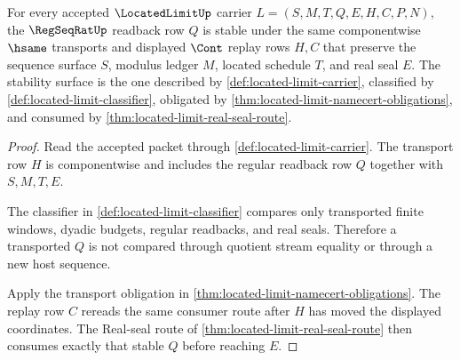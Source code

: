 \begin{theorem}
\label{thm:located-limit-regseqrat-readback-stability}
For every accepted $\LocatedLimitUp$ carrier $L=(S,M,T,Q,E,H,C,P,N)$, the $\RegSeqRatUp$ readback row $Q$ is stable under the same componentwise $\hsame$ transports and displayed $\Cont$ replay rows $H,C$ that preserve the sequence surface $S$, modulus ledger $M$, located schedule $T$, and real seal $E$. The stability surface is the one described by \autoref{def:located-limit-carrier}, classified by \autoref{def:located-limit-classifier}, obligated by \autoref{thm:located-limit-namecert-obligations}, and consumed by \autoref{thm:located-limit-real-seal-route}.
\end{theorem}
\begin{proof}
Read the accepted packet through \autoref{def:located-limit-carrier}. The transport row $H$ is componentwise and includes the regular readback row $Q$ together with $S,M,T,E$.

The classifier in \autoref{def:located-limit-classifier} compares only transported finite windows, dyadic budgets, regular readbacks, and real seals. Therefore a transported $Q$ is not compared through quotient stream equality or through a new host sequence.

Apply the transport obligation in \autoref{thm:located-limit-namecert-obligations}. The replay row $C$ rereads the same consumer route after $H$ has moved the displayed coordinates. The Real-seal route of \autoref{thm:located-limit-real-seal-route} then consumes exactly that stable $Q$ before reaching $E$.
\end{proof}


